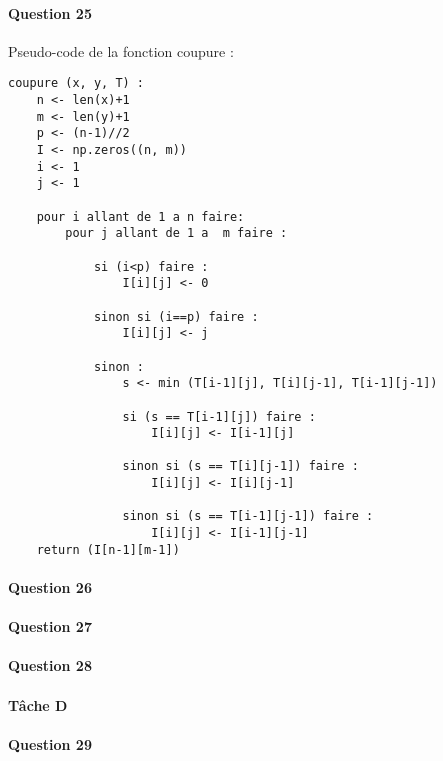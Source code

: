 \paragraph{Question 25}
Pseudo-code de la fonction coupure :
\begin{lstlisting}
coupure (x, y, T) :
    n <- len(x)+1
    m <- len(y)+1
    p <- (n-1)//2
    I <- np.zeros((n, m))
    i <- 1
    j <- 1

    pour i allant de 1 a n faire:
        pour j allant de 1 a  m faire :

            si (i<p) faire :
                I[i][j] <- 0

            sinon si (i==p) faire :
                I[i][j] <- j

            sinon :
                s <- min (T[i-1][j], T[i][j-1], T[i-1][j-1])

                si (s == T[i-1][j]) faire :
                    I[i][j] <- I[i-1][j]

                sinon si (s == T[i][j-1]) faire :
                    I[i][j] <- I[i][j-1]

                sinon si (s == T[i-1][j-1]) faire :
                    I[i][j] <- I[i-1][j-1]
    return (I[n-1][m-1])
\end{lstlisting}
\paragraph{Question 26}
\paragraph{Question 27}
\paragraph{Question 28}
\paragraph{Tâche D}
\paragraph{Question 29}
